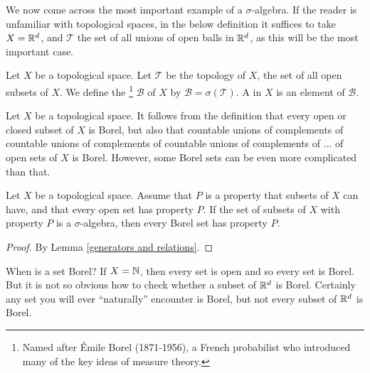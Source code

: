 \begin{subsec}
We now come across the most important example of a $\sigma$-algebra.
If the reader is unfamiliar with topological spaces, in the below definition it suffices to take $X = \mathbb{R}^d$, and $\mathcal T$ the set of all unions of open balls in $\mathbb{R}^d$, as this will be the most important case.
\end{subsec}

\begin{definition}
Let $X$ be a topological space.
Let $\mathcal T$ be the topology of $X$, the set of all open subsets of $X$.
We define the \footnote{Named after Émile Borel (1871-1956), a French probabilist who introduced many of the key ideas of measure theory.}
$\mathcal B$ of $X$ by $\mathcal B = \sigma(\mathcal T)$.
A  in $X$ is an element of $\mathcal B$.
\end{definition}

\begin{subsec}
Let $X$ be a topological space.
It follows from the definition that every open or closed subset of $X$ is Borel, but also that countable unions of complements of countable unions of complements of countable unions of complements of ... of open sets of $X$ is Borel.
However, some Borel sets can be even more complicated than that.
\end{subsec}

\begin{lemma}
Let $X$ be a topological space.
Assume that $P$ is a property that subsets of $X$ can have, and that every open set has property $P$.
If the set of subsets of $X$ with property $P$ is a $\sigma$-algebra, then every Borel set has property $P$.
\end{lemma}
\begin{proof}
By Lemma \ref{generators and relations}.
\end{proof}

\begin{subsec}
When is a set Borel? If $X = \mathbb{N}$, then every set is open and so every set is Borel.
But it is not so obvious how to check whether a subset of $\mathbb{R}^d$ is Borel.
Certainly any set you will ever ``naturally'' encounter is Borel, but not every subset of $\mathbb{R}^d$ is Borel.
\end{subsec}

